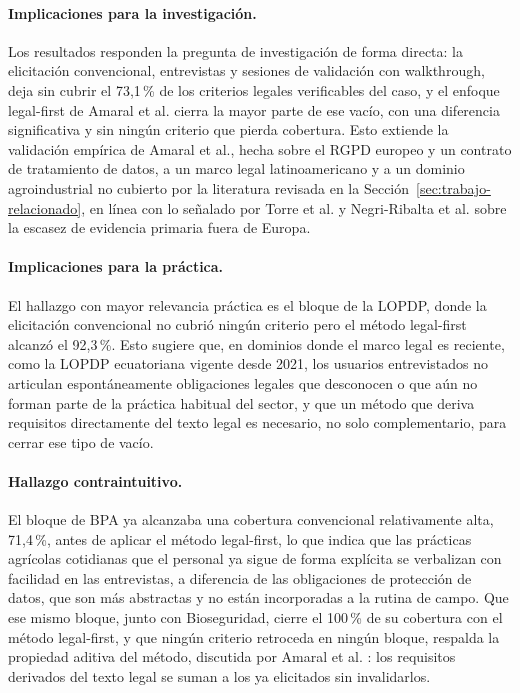 \documentclass[pdflatex,sn-mathphys-num]{sn-jnl}
\begin{document}
\paragraph{Implicaciones para la investigaci\'on.} Los resultados responden la pregunta de investigaci\'on de forma directa: la elicitaci\'on convencional, entrevistas y sesiones de validaci\'on con walkthrough, deja sin cubrir el 73,1\,\% de los criterios legales verificables del caso, y el enfoque legal-first de Amaral et al. \cite{amaral2021} cierra la mayor parte de ese vac\'io, con una diferencia significativa y sin ning\'un criterio que pierda cobertura. Esto extiende la validaci\'on emp\'irica de Amaral et al., hecha sobre el RGPD europeo y un contrato de tratamiento de datos, a un marco legal latinoamericano y a un dominio agroindustrial no cubierto por la literatura revisada en la Secci\'on~\ref{sec:trabajo-relacionado}, en l\'inea con lo se\~nalado por Torre et al. \cite{torre2021} y Negri-Ribalta et al. \cite{negriribalta2024} sobre la escasez de evidencia primaria fuera de Europa.

\paragraph{Implicaciones para la pr\'actica.} El hallazgo con mayor relevancia pr\'actica es el bloque de la LOPDP, donde la elicitaci\'on convencional no cubri\'o ning\'un criterio pero el m\'etodo legal-first alcanz\'o el 92,3\,\%. Esto sugiere que, en dominios donde el marco legal es reciente, como la LOPDP ecuatoriana vigente desde 2021, los usuarios entrevistados no articulan espont\'aneamente obligaciones legales que desconocen o que a\'un no forman parte de la pr\'actica habitual del sector, y que un m\'etodo que deriva requisitos directamente del texto legal es necesario, no solo complementario, para cerrar ese tipo de vac\'io.

\paragraph{Hallazgo contraintuitivo.} El bloque de BPA ya alcanzaba una cobertura convencional relativamente alta, 71,4\,\%, antes de aplicar el m\'etodo legal-first, lo que indica que las pr\'acticas agr\'icolas cotidianas que el personal ya sigue de forma expl\'icita se verbalizan con facilidad en las entrevistas, a diferencia de las obligaciones de protecci\'on de datos, que son m\'as abstractas y no est\'an incorporadas a la rutina de campo. Que ese mismo bloque, junto con Bioseguridad, cierre el 100\,\% de su cobertura con el m\'etodo legal-first, y que ning\'un criterio retroceda en ning\'un bloque, respalda la propiedad aditiva del m\'etodo, discutida por Amaral et al. \cite{amaral2021}: los requisitos derivados del texto legal se suman a los ya elicitados sin invalidarlos.
\end{document}
